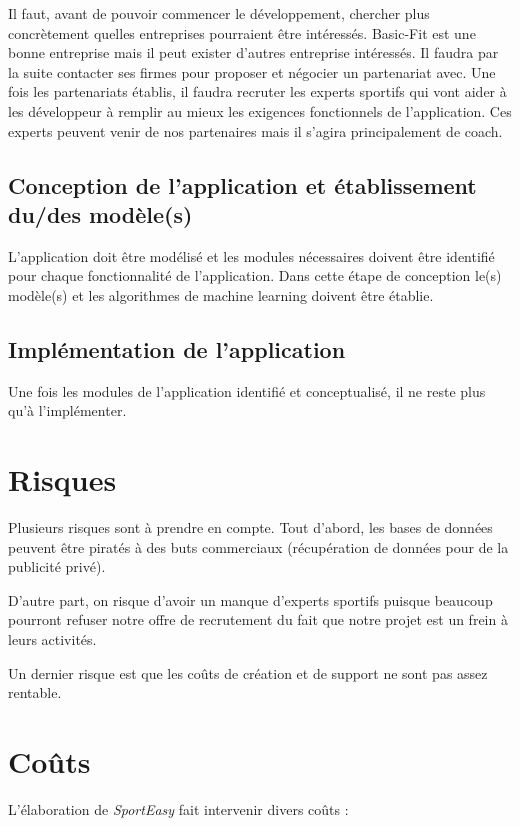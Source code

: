 Il faut, avant de pouvoir commencer le développement, chercher plus concrètement quelles entreprises pourraient être intéressés. Basic-Fit est une bonne entreprise mais il peut exister d'autres entreprise intéressés. Il faudra par la suite contacter ses firmes pour proposer et négocier un partenariat avec.
Une fois les partenariats établis, il faudra recruter les experts sportifs qui vont aider à les développeur à remplir au mieux les exigences fonctionnels de l'application. Ces experts peuvent venir de nos partenaires mais il s'agira principalement de coach. 

\subsection*{Conception de l'application et établissement du/des modèle(s)}

L'application doit être modélisé et les modules nécessaires doivent être identifié pour chaque fonctionnalité de l'application. Dans cette étape de conception le(s) modèle(s) et les algorithmes de machine learning doivent être établie. 

\subsection*{Implémentation de l'application}

Une fois les modules de l'application identifié et conceptualisé, il ne reste plus qu'à l'implémenter. 
 
\section{Risques}

Plusieurs risques sont à prendre en compte. Tout d'abord, les bases de données peuvent être piratés à des buts commerciaux (récupération de données pour de la publicité privé). 

D'autre part, on risque d'avoir un manque d'experts sportifs puisque beaucoup pourront refuser notre offre de recrutement du fait que notre projet est un frein à leurs activités.

Un dernier risque est que les coûts de création et de support ne sont pas assez rentable.


\section{Coûts}

L'élaboration de \textit{SportEasy} fait intervenir divers coûts :


